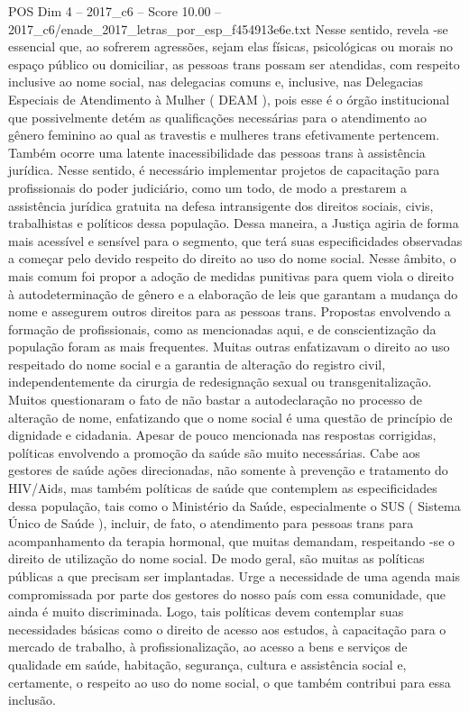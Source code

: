 \begin{textsample}{POS Dim 4 – 2017\_c6 – Score 10.00 – 2017\_c6/enade\_2017\_letras\_por\_esp\_f454913e6e.txt}
Nesse sentido, revela -se essencial que, ao sofrerem agressões, sejam elas físicas, psicológicas ou morais no espaço público ou domiciliar, as pessoas trans possam ser atendidas, com respeito inclusive ao nome social, nas delegacias comuns e, inclusive, nas Delegacias Especiais de Atendimento à Mulher ( DEAM ), pois esse é o órgão institucional que possivelmente detém as qualificações necessárias para o atendimento ao gênero feminino ao qual as travestis e mulheres trans efetivamente pertencem.
Também ocorre uma latente inacessibilidade das pessoas trans à assistência jurídica.
Nesse sentido, é necessário implementar projetos de capacitação para profissionais do poder judiciário, como um todo, de modo a prestarem a assistência jurídica gratuita na defesa intransigente dos direitos sociais, civis, trabalhistas e políticos dessa população.
Dessa maneira, a Justiça agiria de forma mais acessível e sensível para o segmento, que terá suas especificidades observadas a começar pelo devido respeito do direito ao uso do nome social.
Nesse âmbito, o mais comum foi propor a adoção de medidas punitivas para quem viola o direito à autodeterminação de gênero e a elaboração de leis que garantam a mudança do nome e assegurem outros direitos para as pessoas trans.
Propostas envolvendo a formação de profissionais, como as mencionadas aqui, e de conscientização da população foram as mais frequentes.
Muitas outras enfatizavam o direito ao uso respeitado do nome social e a garantia de alteração do registro civil, independentemente da cirurgia de redesignação sexual ou transgenitalização.
Muitos questionaram o fato de não bastar a autodeclaração no processo de alteração de nome, enfatizando que o nome social é uma questão de princípio de dignidade e cidadania.
Apesar de pouco mencionada nas respostas corrigidas, políticas envolvendo a promoção da saúde são muito necessárias.
Cabe aos gestores de saúde ações direcionadas, não somente à prevenção e tratamento do HIV/Aids, mas também políticas de saúde que contemplem as especificidades dessa população, tais como o Ministério da Saúde, especialmente o SUS ( Sistema Único de Saúde ), incluir, de fato, o atendimento para pessoas trans para acompanhamento da terapia hormonal, que muitas demandam, respeitando -se o direito de utilização do nome social.
De modo geral, são muitas as políticas públicas a que precisam ser implantadas.
Urge a necessidade de uma agenda mais compromissada por parte dos gestores do nosso país com essa comunidade, que ainda é muito discriminada.
Logo, tais políticas devem contemplar suas necessidades básicas como o direito de acesso aos estudos, à capacitação para o mercado de trabalho, à profissionalização, ao acesso a bens e serviços de qualidade em saúde, habitação, segurança, cultura e assistência social e, certamente, o respeito ao uso do nome social, o que também contribui para essa inclusão.

\end{textsample}
